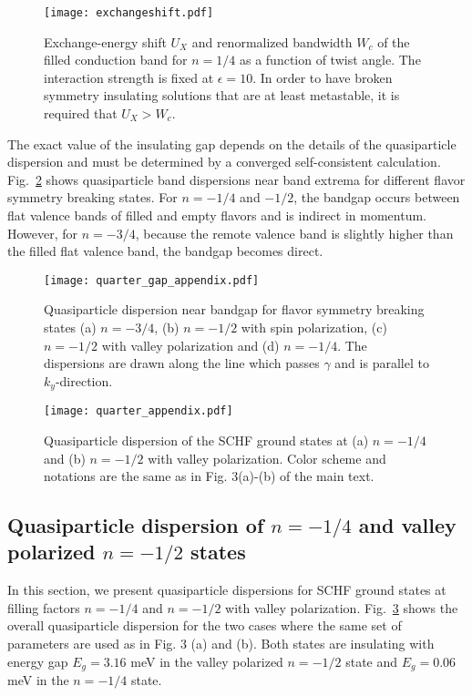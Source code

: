 \documentclass[aps,prl,reprint,amssymb,groupedaddress,twocolumn]{revtex4}
\begin{document}
\begin{figure}[t!]
	\begin{center}
		\centering
		\texttt{[image: exchangeshift.pdf]}
		\caption{Exchange-energy shift $U_X$ and renormalized bandwidth $W_c$ 
			of the filled conduction band for $n=1/4$ as a function of twist angle. 
			The interaction strength is fixed at $\epsilon=10$. 
			In order to have broken symmetry insulating solutions that are at least metastable, it is required that 
			$U_X > W_c$.}
		\label{exchangeshift}
	\end{center}
\end{figure}

The exact value of the insulating gap depends on the details of the quasiparticle dispersion and must 
be determined by a converged self-consistent calculation.  
Fig.~\ref{quarter_gap} shows quasiparticle band dispersions near band extrema
 for different flavor symmetry breaking states.
For $n=-1/4$ and $-1/2$, the bandgap occurs between flat valence bands of filled and empty flavors 
and is indirect in momentum.
However, for $n=-3/4$, because the remote valence band is slightly higher than the filled flat valence band,
the bandgap becomes direct.

\begin{figure}[t!]
	\begin{center}
		\centering
		\texttt{[image: quarter\_gap\_appendix.pdf]}
		\caption{Quasiparticle dispersion near bandgap for flavor symmetry breaking states
			(a) $n=-3/4$, (b) $n=-1/2$ with spin polarization, (c) $n=-1/2$ with valley polarization
			and (d) $n=-1/4$.  The dispersions are drawn along the line which passes $\gamma$ 
			and is parallel to $k_y$-direction.}
		\label{quarter_gap}
	\end{center}
\end{figure}

\begin{figure}[t!]
	\begin{center}
		\centering
		\texttt{[image: quarter\_appendix.pdf]}
		\caption{Quasiparticle dispersion of the SCHF ground states at  (a) $n=-1/4$ and  (b) $n=-1/2$ with valley polarization.
			Color scheme and notations are the same as in Fig. 3(a)-(b) of the main text.}
		\label{multiflavor_more}
	\end{center}
\end{figure}

\subsection{Quasiparticle dispersion of $n=-1/4$ and valley polarized $n=-1/2$ states}  %
In this section, we present quasiparticle dispersions for SCHF ground states at filling factors 
$n=-1/4$ and $n=-1/2$ with valley polarization.
Fig.~\ref{multiflavor_more} shows the overall quasiparticle dispersion for the two cases where
the same set of parameters are used as in Fig. 3 (a) and (b).
Both states are insulating with energy gap $E_g=3.16$ meV in the valley polarized $n=-1/2$ state
and $E_g=0.06$ meV in the $n=-1/4$ state.
\end{document}

